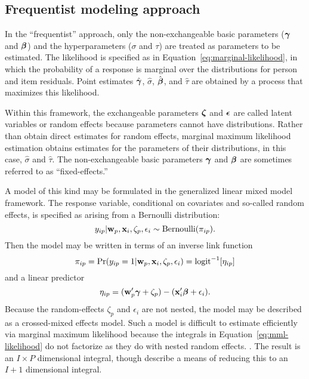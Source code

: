 \documentclass[12pt, letterpaper]{article}
\begin{document}
\subsection{Frequentist modeling approach}

In the ``frequentist'' approach, only the non-exchangeable basic parameters ($\boldsymbol{\gamma}$ and  $\boldsymbol{\beta}$) and the hyperparameters ($\sigma$ and $\tau$) are treated as parameters to be estimated. The likelihood is specified as in Equation~\ref{eq:marginal-likelihood}, in which the probability of a response is marginal over the distributions for person and item residuals. Point estimates $\hat{\boldsymbol{\gamma}}$, $\hat\sigma$, $\hat{\boldsymbol{\beta}}$, and $\hat\tau$ are obtained by a process that maximizes this likelihood.

Within this framework, the exchangeable parameters $\boldsymbol{\zeta}$ and $\boldsymbol{\epsilon}$ are called latent variables or random effects because parameters cannot have distributions. Rather than obtain direct estimates for random effects, marginal maximum likelihood estimation obtains estimates for the parameters of their distributions, in this case, $\hat \sigma$ and $\hat\tau$. The non-exchangeable basic parameters $\boldsymbol{\gamma}$ and $\boldsymbol{\beta}$ are sometimes referred to as ``fixed-effects.''

A model of this kind may be formulated in the generalized linear mixed model framework. The response variable, conditional on covariates and so-called random effects, is specified as arising from a Bernoulli distribution: 
\begin{equation}
	y_{ip} | \mathbf{w}_p, \mathbf{x}_i, \zeta_p, \epsilon_i \sim \mathrm{Bernoulli}(\pi_{ip})
.\end{equation}
Then the model may be written in terms of an inverse link function
\begin{equation}
	\pi_{ip} = 
	\Pr({y_{ip}} = 1 | \mathbf{w}_p, \mathbf{x}_i, \zeta_p, \epsilon_i) =
	\mathrm{logit}^{-1}[\eta_{ip}]
\end{equation}
and a linear predictor
\begin{equation}
	\eta_{ip} =
	(\mathbf{w}_p'\boldsymbol{\gamma} + \zeta_p) -
	(\mathbf{x}_i'\boldsymbol{\beta} + \epsilon_i)
.\end{equation}
Because the random-effects $\zeta_p$ and $\epsilon_i$ are not nested, the model may be described as a crossed-mixed effects model. Such a model is difficult to estimate efficiently via marginal maximum likelihood because the integrals in Equation~\ref{eq:mml-likelihood} do not factorize as they do with nested random effects. \cite{}. The result is an $I \times P$ dimensional integral, though  describe a means of reducing this to an $I + 1$ dimensional integral.
\end{document}
